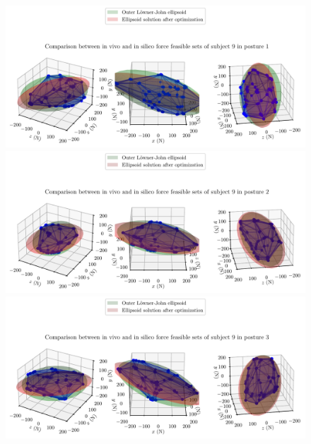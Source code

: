 \clearpage
\begin{figure}[!htb]
    \centering
    \begin{minipage}{1\linewidth}
        \captionsetup{justification=centering}
        \centering
        \includegraphics[trim=0 0 0 60, clip, width=0.8\linewidth]{img/chapter_5/subject_104_solution_7_posture_1.pdf}
    \end{minipage}
    \hfill
    \begin{minipage}{1\linewidth}
        \captionsetup{justification=centering}
        \centering
        \includegraphics[trim=0 0 0 60, clip, width=0.8\linewidth]{img/chapter_5/subject_104_solution_7_posture_2.pdf}
    \end{minipage}
    \begin{minipage}{1\linewidth}
        \captionsetup{justification=centering}
        \centering
        \includegraphics[trim=0 0 0 60, clip, width=0.8\linewidth]{img/chapter_5/subject_104_solution_7_posture_3.pdf}
    \end{minipage}
    \begin{minipage}{1\linewidth}

\end{minipage}
\end{figure}
